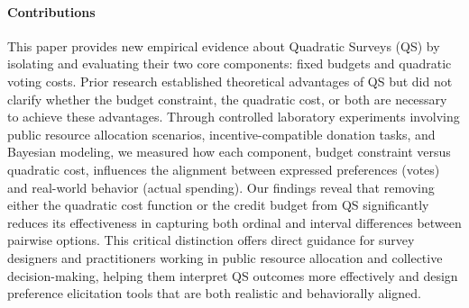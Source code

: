 \paragraph{Contributions} This paper provides new empirical evidence about Quadratic Surveys (QS) by isolating and evaluating their two core components: fixed budgets and quadratic voting costs. Prior research established theoretical advantages of QS but did not clarify whether the budget constraint, the quadratic cost, or both are necessary to achieve these advantages. Through controlled laboratory experiments involving public resource allocation scenarios, incentive-compatible donation tasks, and Bayesian modeling, we measured how each component, budget constraint versus quadratic cost, influences the alignment between expressed preferences (votes) and real-world behavior (actual spending). Our findings reveal that removing either the quadratic cost function or the credit budget from QS significantly reduces its effectiveness in capturing both ordinal and interval differences between pairwise options. This critical distinction offers direct guidance for survey designers and practitioners working in public resource allocation and collective decision-making, helping them interpret QS outcomes more effectively and design preference elicitation tools that are both realistic and behaviorally aligned.



